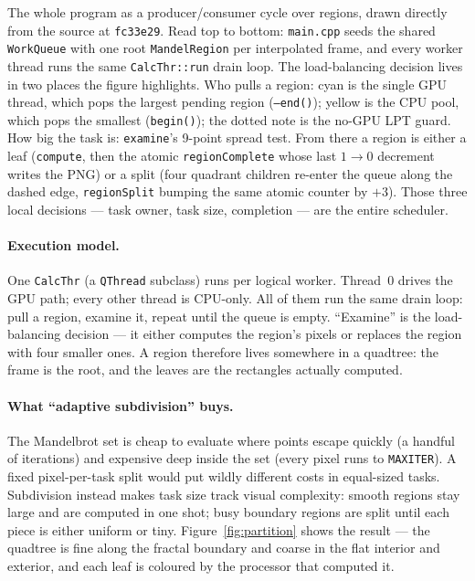 \documentclass[
	english,
	letterpaper, oneside
]{article}
\begin{document}
            {The whole program as a producer/consumer cycle over regions, drawn
             directly from the source at \texttt{fc33e29}. Read top to bottom:
             \texttt{main.cpp} seeds the shared \texttt{WorkQueue} with one root
             \texttt{MandelRegion} per interpolated frame, and every worker
             thread runs the same \texttt{CalcThr::run} drain loop. The
             load-balancing decision lives in two places the figure highlights.
             Who pulls a region: cyan is the single GPU thread, which pops
             the largest pending region (\texttt{--end()}); yellow is the
             CPU pool, which pops the smallest (\texttt{begin()}); the
             dotted note is the no-GPU LPT guard. How big the task is:
             \texttt{examine}'s 9-point spread test. From there a region is
             either a leaf (\texttt{compute}, then the atomic
             \texttt{regionComplete} whose last $1\!\to\!0$ decrement writes the
             PNG) or a split (four quadrant children re-enter the queue
             along the dashed edge, \texttt{regionSplit} bumping the same atomic
             counter by $+3$). Those three local decisions --- task owner, task
             size, completion --- are the entire scheduler.\label{fig:arch}}

\paragraph{Execution model.} One \texttt{CalcThr} (a \texttt{QThread} subclass)
runs per logical worker. Thread~0 drives the GPU path; every other thread is
CPU-only. All of them run the same drain loop: pull a region, examine it, repeat
until the queue is empty. ``Examine'' is the load-balancing decision --- it either
computes the region's pixels or replaces the region with four smaller ones. A
region therefore lives somewhere in a quadtree: the frame is the root, and
the leaves are the rectangles actually computed.

\paragraph{What ``adaptive subdivision'' buys.} The Mandelbrot set is cheap to
evaluate where points escape quickly (a handful of iterations) and expensive deep
inside the set (every pixel runs to \texttt{MAXITER}). A fixed pixel-per-task
split would put wildly different costs in equal-sized tasks. Subdivision instead
makes task size track visual complexity: smooth regions stay large
and are computed in one shot; busy boundary regions are split until each piece is
either uniform or tiny. Figure~\ref{fig:partition} shows the result --- the
quadtree is fine along the fractal boundary and coarse in the flat interior and
exterior, and each leaf is coloured by the processor that computed it.
\end{document}
